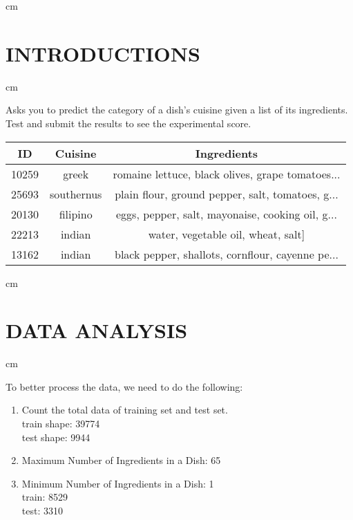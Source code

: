  cm%
\section{INTRODUCTIONS}\label{sec-intro}
 cm%

\setlength{\parindent}{2em}


Asks you to predict the category of a dish's cuisine given a list of its ingredients. Test and submit the results to see the experimental score.


  \begin{tabular}{ c | c | c }
    \toprule
    ID &  Cuisine    & Ingredients      \\
    \midrule
    10259 &  greek & romaine lettuce, black olives, grape tomatoes...\\
    25693 & southernus &plain flour, ground pepper, salt, tomatoes, g...\\
    20130  & filipino &eggs, pepper, salt, mayonaise, cooking oil, g... \\
    22213 & indian &water, vegetable oil, wheat, salt]\\
    13162& indian& black pepper, shallots, cornflour, cayenne pe...\\
    \bottomrule
\end{tabular}

 cm%
\section{DATA ANALYSIS} \label{sec-preliminaries}
 cm%
\setlength{\parindent}{2em}

To better process the data, we need to do the following:


\begin{enumerate}[1]
 
  \item Count the total data of training set and test set.\\
  train shape: 39774\\
  test shape: 9944
  \item
        Maximum Number of Ingredients in a Dish:  65
        \item
        Minimum Number of Ingredients in a Dish:  1\\
        train: 8529\\
        test: 3310
\end{enumerate}



